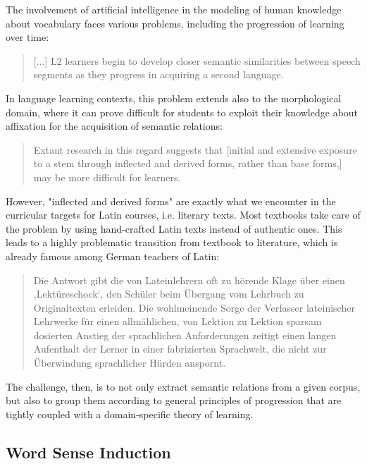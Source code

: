\documentclass[jou]{apa6} %
\begin{document}
The involvement of artificial intelligence in the modeling of human knowledge about vocabulary faces various problems, including the progression of learning over time:
\blockquote[{\cite[p.~70]{crossleyDevelopmentSemanticRelations2010}}]{[...] L2 learners begin to develop closer semantic similarities between speech segments as they progress in acquiring a second language.}
In language learning contexts, this problem extends also to the morphological domain, where it can prove difficult for students to exploit their knowledge about affixation for the acquisition of semantic relations:
\blockquote[{\cite[p.~248]{gardnerValidatingConstructWord2007}}]{Extant research in this regard suggests that [initial and extensive exposure to a stem through inflected and derived forms, rather than base forms,] may be more difficult for learners.}
However, "inflected and derived forms" are exactly what we encounter in the curricular targets for Latin courses, i.e. literary texts. Most textbooks take care of the problem by using hand-crafted Latin texts instead of authentic ones. This leads to a highly problematic transition from textbook to literature, which is already famous among German teachers of Latin:
\blockquote[{\cite[p.~115]{schibelZurAneignungLateinischer2013}}]{Die Antwort gibt die von Lateinlehrern oft zu hörende Klage über einen ,Lektüreschock‘, den Schüler beim Übergang vom Lehrbuch zu Originaltexten erleiden. Die wohlmeinende Sorge der Verfasser lateinischer Lehrwerke für einen allmählichen, von Lektion zu Lektion sparsam dosierten Anstieg der sprachlichen Anforderungen zeitigt einen langen Aufenthalt der Lerner in einer fabrizierten Sprachwelt, die nicht zur Überwindung sprachlicher Hürden anspornt.}
The challenge, then, is to not only extract semantic relations from a given corpus, but also to group them according to general principles of progression that are tightly coupled with a domain-specific theory of learning.

\subsection{Word Sense Induction}
\label{polysemyProblemForSemanticRelations}
\end{document}
